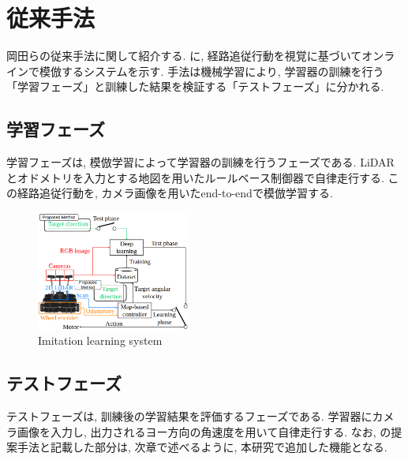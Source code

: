 \documentclass[10pt]{jarticle}
\begin{document}
    \section{従来手法}
    岡田らの従来手法に関して紹介する. 
    に, 経路追従行動を視覚に基づいてオンラインで模倣するシステムを示す. 
    手法は機械学習により, 学習器の訓練を行う「学習フェーズ」と訓練した結果を検証する「テストフェーズ」に分かれる.
    \subsection{学習フェーズ}
    学習フェーズは, 模倣学習によって学習器の訓練を行うフェーズである. LiDARとオドメトリを入力とする地図を用いたルールベース制御器で自律走行する. この経路追従行動を, カメラ画像を用いたend-to-endで模倣学習する.

    \begin{center}
        \begin{figure}[h]
            \includegraphics[width=0.45\textwidth]{./fig/system2.png}
            \caption{Imitation learning system}
            \label{fig:sample-fig}
        \end{figure}
    \end{center}

    \subsection{テストフェーズ}

    テストフェーズは, 訓練後の学習結果を評価するフェーズである. 学習器にカメラ画像を入力し, 出力されるヨー方向の角速度を用いて自律走行する.
    なお, の提案手法と記載した部分は, 次章で述べるように, 本研究で追加した機能となる.
\end{document}
